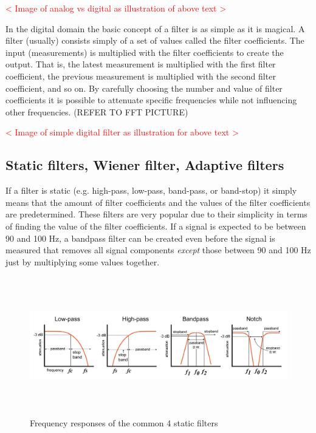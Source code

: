\textcolor{red}{< Image of analog vs digital as illustration of above text >}

In the digital domain the basic concept of a filter is as simple as it is magical. A filter (usually) consists simply of a set of values called the filter coefficients. The input (measurements) is multiplied with the filter coefficients to create the output. That is, the latest measurement is multiplied with the first filter coefficient, the previous measurement is multiplied with the second filter coefficient, and so on. By carefully choosing the number and value of filter coefficients it is possible to attenuate specific frequencies while not influencing other frequencies. (REFER TO FFT PICTURE)

\textcolor{red}{< Image of simple digital filter as illustration for above text >}

\subsection{Static filters, Wiener filter, Adaptive filters}
If a filter is static (e.g. high-pass, low-pass, band-pass, or band-stop) it simply means that the amount of filter coefficients and the values of the filter coefficients are predetermined. These filters are very popular due to their simplicity in terms of finding the value of the filter coefficients. If a signal is expected to be between 90 and 100 Hz, a bandpass filter can be created even before the signal is measured that removes all signal components \textit{except} those between 90 and 100 Hz just by multiplying some values together. 

\begin{figure}[h!t]
	\begin{center}
		\includegraphics[height=60mm]{images/Davis_intro_to_filters_filter_types.png}
	\end{center}
	\caption{Frequency responses of the common 4 static filters \cite{intro_to_static_filters}}
	\label{fig:static_filters}
\end{figure}

